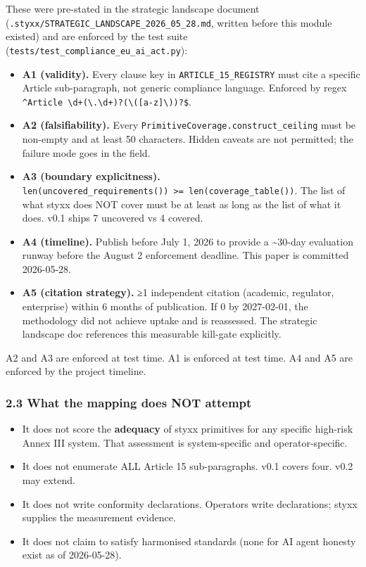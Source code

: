 \documentclass[
]{article}
\newcounter{none} %
\providecommand{\tightlist}{%
  \setlength{\itemsep}{0pt}\setlength{\parskip}{0pt}}
\begin{document}
These were pre-stated in the strategic landscape document
(\texttt{.styxx/STRATEGIC\_LANDSCAPE\_2026\_05\_28.md}, written before
this module existed) and are enforced by the test suite
(\texttt{tests/test\_compliance\_eu\_ai\_act.py}):

\begin{itemize}
\tightlist
\item
  \textbf{A1 (validity).} Every clause key in
  \texttt{ARTICLE\_15\_REGISTRY} must cite a specific Article
  sub-paragraph, not generic compliance language. Enforced by regex
  \texttt{\^{}Article\ \textbackslash{}d+(\textbackslash{}.\textbackslash{}d+)?(\textbackslash{}({[}a-z{]}\textbackslash{}))?\$}.
\item
  \textbf{A2 (falsifiability).} Every
  \texttt{PrimitiveCoverage.construct\_ceiling} must be non-empty and at
  least 50 characters. Hidden caveats are not permitted; the failure
  mode goes in the field.
\item
  \textbf{A3 (boundary explicitness).}
  \texttt{len(uncovered\_requirements())\ \textgreater{}=\ len(coverage\_table())}.
  The list of what styxx does NOT cover must be at least as long as the
  list of what it does. v0.1 ships 7 uncovered vs 4 covered.
\item
  \textbf{A4 (timeline).} Publish before July 1, 2026 to provide a
  \textasciitilde30-day evaluation runway before the August 2
  enforcement deadline. This paper is committed 2026-05-28.
\item
  \textbf{A5 (citation strategy).} ≥1 independent citation (academic,
  regulator, enterprise) within 6 months of publication. If 0 by
  2027-02-01, the methodology did not achieve uptake and is reassessed.
  The strategic landscape doc references this measurable kill-gate
  explicitly.
\end{itemize}

A2 and A3 are enforced at test time. A1 is enforced at test time. A4 and
A5 are enforced by the project timeline.

\subsubsection{2.3 What the mapping does NOT
attempt}\label{what-the-mapping-does-not-attempt}

\begin{itemize}
\tightlist
\item
  It does not score the \textbf{adequacy} of styxx primitives for any
  specific high-risk Annex III system. That assessment is
  system-specific and operator-specific.
\item
  It does not enumerate ALL Article 15 sub-paragraphs. v0.1 covers four.
  v0.2 may extend.
\item
  It does not write conformity declarations. Operators write
  declarations; styxx supplies the measurement evidence.
\item
  It does not claim to satisfy harmonised standards (none for AI agent
  honesty exist as of 2026-05-28).
\end{itemize}
\end{document}
